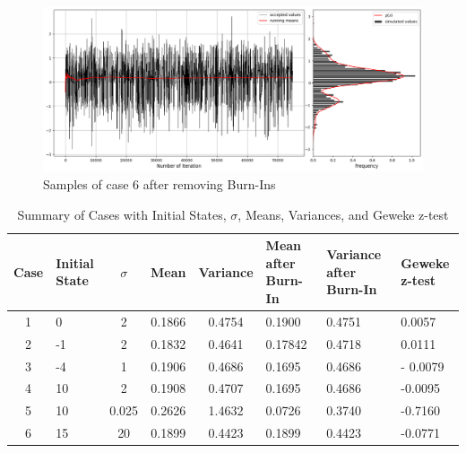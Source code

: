 \begin{example}
    \begin{figure}[H]
        \centering
        \includegraphics[width=1\textwidth]{./images/metropolis/sample-6-value-hist-bo.png}
        \caption{Samples of case 6 after removing Burn-Ins}
    \end{figure}

    \begin{table}[ht]
        \centering
        \begin{tabular}{|c|p{2cm}|c|c|c|p{2cm}|p{2cm}|p{2cm}|}
            \hline
            Case & Initial State & $\sigma$ & Mean & Variance & Mean after Burn-In & Variance after Burn-In & Geweke z-test \\ \hline
            1 & 0 & 2 & 0.1866 & 0.4754 & 0.1900 & 0.4751 & 0.0057 \\ \hline
            2 & -1 & 2 & 0.1832 & 0.4641 & 0.17842 & 0.4718 & 0.0111 \\ \hline
            3 & -4 & 1 & 0.1906 & 0.4686 & 0.1695 & 0.4686 & - 0.0079 \\ \hline
            4 & 10 & 2 & 0.1908 & 0.4707 & 0.1695 & 0.4686 & -0.0095 \\ \hline
            5 & 10 & 0.025 & 0.2626 & 1.4632 & 0.0726 & 0.3740 & -0.7160 \\ \hline
            6 & 15 & 20 & 0.1899 & 0.4423 & 0.1899 & 0.4423 & -0.0771 \\ \hline
        \end{tabular}
        \caption{Summary of Cases with Initial States, $\sigma$, Means, Variances, and Geweke z-test}
    \end{table}

\end{example}





